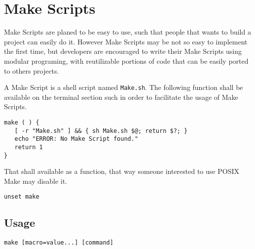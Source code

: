 \section{Make Scripts}

Make Scripts are planed to be easy to use,
such that people that wants to build a project can easily do it.
However Make Scripts may be not so easy to implement the first time,
but developers are encouraged to write their Make Scripts
using modular programing, with reutilizable portions of code that can be easily
ported to others projects.

A Make Script is a shell script named \texttt{Make.sh}.
The following function shall be available on the terminal section
such in order to facilitate the usage of Make Scripts.

\begin{lstlisting}[style=sh]
make ( ) {
   [ -r "Make.sh" ] && { sh Make.sh $@; return $?; }
   echo "ERROR: No Make Script found."
   return 1
}
\end{lstlisting}

That shall available as a function, that way someone interested to use
POSIX Make may disable it.

\begin{lstlisting}[style=sh]
unset make
\end{lstlisting}

\subsection{Usage}

\begin{lstlisting}[style=sh]
make [macro=value...] [command]
\end{lstlisting}
